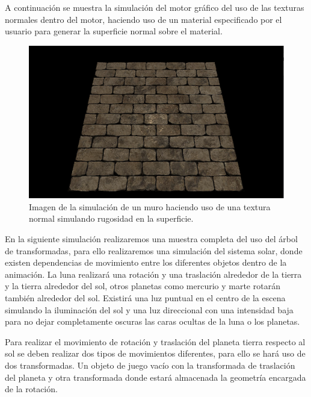 \documentclass[a4paper, 17pt]{book}
\begin{document}
A continuación se muestra la simulación del motor gráfico del uso de las texturas normales dentro del motor, haciendo uso de un
material especificado por el usuario para generar la superficie normal sobre el material.

\begin{figure}[H]
    \centering
    \includegraphics[scale=0.50, keepaspectratio]{img/WallResult.png}
    \caption{Imagen de la simulación de un muro haciendo uso de una textura normal simulando rugosidad en la superficie.}
    \label{figura:WallResult}
\end{figure}

En la siguiente simulación realizaremos una muestra completa del uso del árbol de transformadas, para ello realizaremos
una simulación del sistema solar, donde existen dependencias de movimiento entre los diferentes objetos dentro de la
animación. La luna realizará una rotación y una traslación alrededor de la tierra y la tierra alrededor del sol, otros
planetas como mercurio y marte rotarán también alrededor del sol. Existirá una luz puntual en el centro de la escena
simulando la  iluminación del sol y una luz direccional con una intensidad baja para no dejar completamente oscuras
las caras ocultas de la luna o los planetas.

\vspace{1mm} %

Para realizar el movimiento de rotación y traslación del planeta tierra respecto al sol se deben realizar dos tipos de
movimientos diferentes, para ello se hará uso de dos transformadas. Un objeto de juego vacío con la transformada de
traslación del planeta y otra transformada donde estará almacenada la geometría encargada de la rotación.
\end{document}
